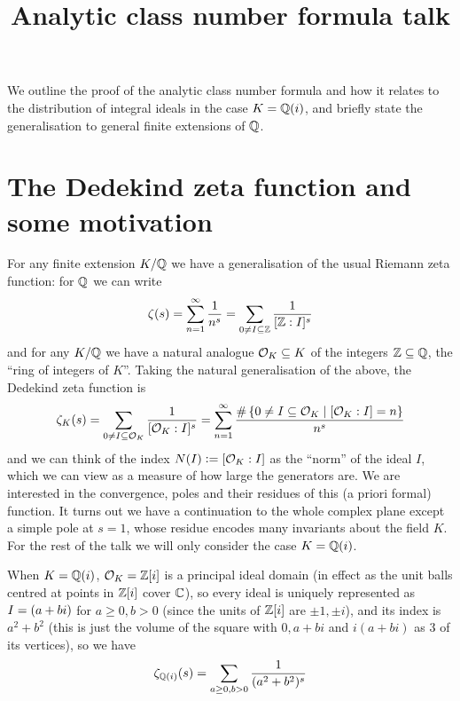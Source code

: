 \documentclass[11pt]{article}
\title{Analytic class number formula talk}
\begin{document}
\maketitle
We outline the proof of the analytic class number formula and how it relates to the distribution of integral ideals in the case $K = \mathbb{Q}(i)$, and briefly state the generalisation to general finite extensions of $\mathbb{Q}$.

\section{The Dedekind zeta function and some motivation}
For any finite extension $K / \mathbb{Q}$ we have a generalisation of the usual Riemann zeta function: for $\mathbb{Q}$ we can write
$$
    \zeta(s) = \sum_{n = 1}^\infty \frac1{n^s} = \sum_{0 \neq I \subseteq \mathbb{Z}} \frac1{[\mathbb{Z} : I]^s}
$$
and for any $K / \mathbb{Q}$ we have a natural analogue $\mathcal{O}_K \subseteq K$ of the integers $\mathbb{Z} \subseteq \mathbb{Q}$, the ``ring of integers of $K$''. Taking the natural generalisation of the above, the Dedekind zeta function is
$$
    \zeta_K(s) = \sum_{0 \neq I \subseteq \mathcal{O}_K} \frac1{[\mathcal{O}_K : I]^s} = \sum_{n = 1}^\infty \frac{\#\left\{  0 \neq I \subseteq \mathcal{O}_K \mid [\mathcal{O}_K : I] = n  \right\}}{n^s}
$$
and we can think of the index $N(I) \vcentcolon= [\mathcal{O}_K : I]$ as the ``norm'' of the ideal $I$, which we can view as a measure of how large the generators are. We are interested in the convergence, poles and their residues of this (a priori formal) function. It turns out we have a continuation to the whole complex plane except a simple pole at $s = 1$, whose residue encodes many invariants about the field $K$. For the rest of the talk we will only consider the case $K = \mathbb{Q}(i)$.

When $K = \mathbb{Q}(i)$, $\mathcal{O}_K = \mathbb{Z}[i]$ is a principal ideal domain (in effect as the unit balls centred at points in $\mathbb{Z}[i]$ cover $\mathbb{C}$), so every ideal is uniquely represented as $I = \left(  a + bi  \right)$ for $a \geq 0, b > 0$ (since the units of $\mathbb{Z}[i]$ are $\pm 1, \pm i$), and its index is $a^2 + b^2$ (this is just the volume of the square with $0, a + bi$ and $i(a + bi)$ as 3 of its vertices), so we have
$$
    \zeta_{\mathbb{Q}(i)}(s) = \sum_{a \geq 0, b > 0} \frac1{(a^2 + b^2)^s}
$$
\end{document}
